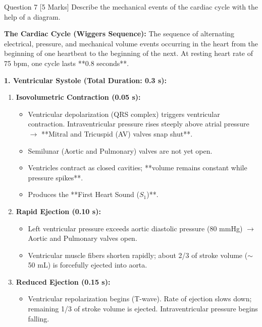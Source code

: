 \documentclass[11pt,a4paper]{article}
\begin{document}
\begin{qbox}{Question 7 [5 Marks]}
Describe the mechanical events of the cardiac cycle with the help of a diagram.
\end{qbox}

\begin{ansbox}
\textbf{The Cardiac Cycle (Wiggers Sequence):}
The sequence of alternating electrical, pressure, and mechanical volume events occurring in the heart from the beginning of one heartbeat to the beginning of the next. At resting heart rate of 75 bpm, one cycle lasts **0.8 seconds**.

\textbf{1. Ventricular Systole (Total Duration: 0.3 s):}
\begin{enumerate}[leftmargin=*]
    \item \textbf{Isovolumetric Contraction (0.05 s):}
    \begin{itemize}
        \item Ventricular depolarization (QRS complex) triggers ventricular contraction. Intraventricular pressure rises steeply above atrial pressure $\rightarrow$ **Mitral and Tricuspid (AV) valves snap shut**.
        \item Semilunar (Aortic and Pulmonary) valves are not yet open.
        \item Ventricles contract as closed cavities; **volume remains constant while pressure spikes**.
        \item Produces the **First Heart Sound ($S_1$)**.
    \end{itemize}
    \item \textbf{Rapid Ejection (0.10 s):}
    \begin{itemize}
        \item Left ventricular pressure exceeds aortic diastolic pressure (80 mmHg) $\rightarrow$ Aortic and Pulmonary valves open.
        \item Ventricular muscle fibers shorten rapidly; about 2/3 of stroke volume ($\sim$50 mL) is forcefully ejected into aorta.
    \end{itemize}
    \item \textbf{Reduced Ejection (0.15 s):}
    \begin{itemize}
        \item Ventricular repolarization begins (T-wave). Rate of ejection slows down; remaining 1/3 of stroke volume is ejected. Intraventricular pressure begins falling.
    \end{itemize}
\end{enumerate}


\end{ansbox}
\end{document}
